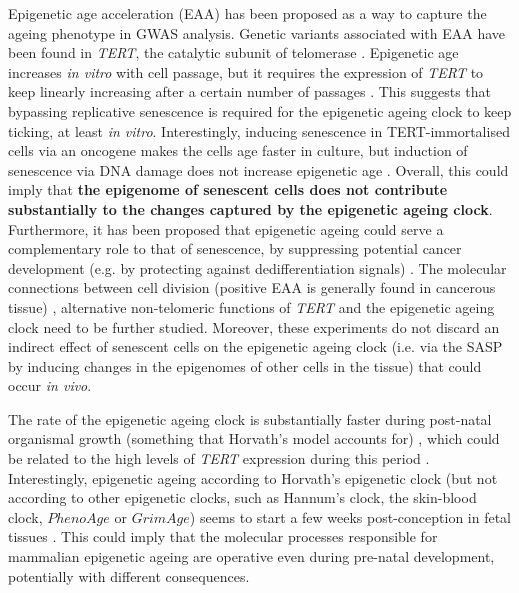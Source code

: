 Epigenetic age acceleration (\acrshort{EAA}) has been proposed as a way to capture the ageing phenotype in GWAS analysis. Genetic variants associated with \acrshort{EAA} have been found in \textit{TERT}, the catalytic subunit of telomerase \cite{Lu2018}. Epigenetic age increases \textit{in vitro} with cell passage, but it requires the expression of \textit{TERT} to keep linearly increasing after a certain number of passages \cite{Lu2018}. This suggests that bypassing replicative senescence is required for the epigenetic ageing clock to keep ticking, at least \textit{in vitro}. Interestingly, inducing senescence in TERT-immortalised cells via an oncogene makes the cells age faster in culture, but induction of senescence via DNA damage does not increase epigenetic age \cite{Lowe2016}. Overall, this could imply that \textbf{the epigenome of senescent cells does not contribute substantially to the changes captured by the epigenetic ageing clock}. Furthermore, it has been proposed that epigenetic ageing could serve a complementary role to that of senescence, by suppressing potential cancer development (e.g. by protecting against dedifferentiation signals) \cite{Horvath2018}. The molecular connections between cell division (positive \acrshort{EAA} is generally found in cancerous tissue) \cite{Hannum2013,Horvath2013}, alternative non-telomeric functions of \textit{TERT} and the epigenetic ageing clock need to be further studied. Moreover, these experiments do not discard an indirect effect of senescent cells on the epigenetic ageing clock (i.e. via the \acrshort{SASP} by inducing changes in the epigenomes of other cells in the tissue) that could occur \textit{in vivo}. 

\bigskip

The rate of the epigenetic ageing clock is substantially faster during post-natal organismal growth (something that Horvath's model accounts for) \cite{Horvath2013}, which could be related to the high levels of \textit{TERT} expression during this period \cite{Lu2018}. Interestingly, epigenetic ageing according to Horvath's epigenetic clock (but not according to other epigenetic clocks, such as Hannum's clock, the skin-blood clock, $PhenoAge$ or $GrimAge$) seems to start a few weeks post-conception in fetal tissues \cite{Hoshino2019}. This could imply that the molecular processes responsible for mammalian epigenetic ageing are operative even during pre-natal development, potentially with different consequences. 

\bigskip

